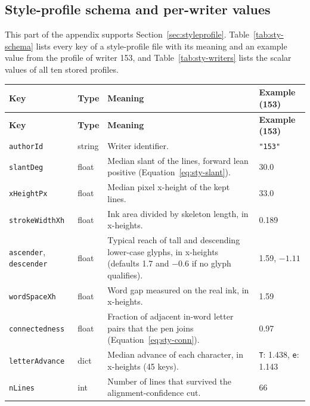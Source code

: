
\subsection{Style-profile schema and per-writer values}

This part of the appendix supports Section~\ref{sec:styleprofile}.
Table~\ref{tab:sty-schema} lists every key of a style-profile file with its meaning and an example value from the profile of writer 153, and Table~\ref{tab:sty-writers} lists the scalar values of all ten stored profiles.

{
\fontsize{9.5}{11.5}\selectfont
\setlength{\tabcolsep}{4pt}
\begin{longtable}{|p{3.2cm}|p{1.6cm}|p{6.6cm}|p{2.5cm}|}
\hline
\textbf{Key} & \textbf{Type} & \textbf{Meaning} & \textbf{Example (153)} \\
\hline
\endfirsthead
\hline
\textbf{Key} & \textbf{Type} & \textbf{Meaning} & \textbf{Example (153)} \\
\hline
\endhead
\hline
\endfoot
\texttt{authorId} & string & Writer identifier. & \texttt{"153"} \\
\hline
\texttt{slantDeg} & float & Median slant of the lines, forward lean positive (Equation~\ref{eq:sty-slant}). & 30.0 \\
\hline
\texttt{xHeightPx} & float & Median pixel x-height of the kept lines. & 33.0 \\
\hline
\texttt{strokeWidthXh} & float & Ink area divided by skeleton length, in x-heights. & 0.189 \\
\hline
\texttt{ascender}, \texttt{descender} & float & Typical reach of tall and descending lower-case glyphs, in x-heights (defaults 1.7 and $-0.6$ if no glyph qualifies). & 1.59, $-1.11$ \\
\hline
\texttt{wordSpaceXh} & float & Word gap measured on the real ink, in x-heights. & 1.59 \\
\hline
\texttt{connectedness} & float & Fraction of adjacent in-word letter pairs that the pen joins (Equation~\ref{eq:sty-conn}). & 0.97 \\
\hline
\texttt{letterAdvance} & dict & Median advance of each character, in x-heights (45 keys). & \texttt{T}: 1.438, \texttt{e}: 1.143 \\
\hline
\texttt{nLines} & int & Number of lines that survived the alignment-confidence cut. & 66 \\

\end{longtable}}
